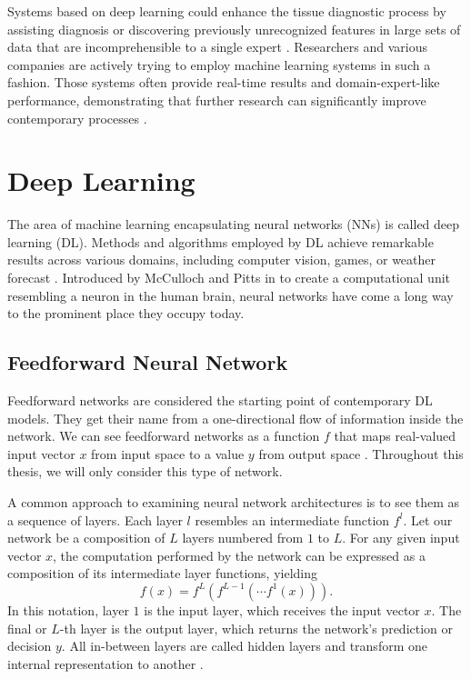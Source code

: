 Systems based on deep learning could enhance the tissue diagnostic process by assisting diagnosis or discovering previously unrecognized features in large sets of data that are incomprehensible to a single expert \cite{dss-digital-histopathology}. 
Researchers and various companies are actively trying to employ machine learning systems in such a fashion. 
Those systems often provide real-time results and domain-expert-like performance, demonstrating that further research can significantly improve contemporary processes \cite{deep-learning-in-histopathology}.

\section{Deep Learning}\label{section:dl}

The area of machine learning encapsulating neural networks (NNs) is called deep learning (DL).
Methods and algorithms employed by DL achieve remarkable results across various domains, including computer vision, games, or weather forecast \cite{alexnet, alphago, weather}.
Introduced by McCulloch and Pitts in \cite{mcculloch-pitts} to create a computational unit resembling a neuron in the human brain, neural networks have come a long way to the prominent place they occupy today.

\subsection*{Feedforward Neural Network}\label{feedforward-nn}

Feedforward networks are considered the starting point of contemporary DL models.
They get their name from a one-directional flow of information inside the network.
We can see feedforward networks as a function $f$ that maps real-valued input vector $x$ from input space to a value $y$ from output space \cite{goodfellow}.
Throughout this thesis, we will only consider this type of network.

A common approach to examining neural network architectures is to see them as a sequence of layers.
Each layer $l$ resembles an intermediate function $f^l$.
Let our network be a composition of $L$ layers numbered from $1$ to $L$.
For any given input vector $x$, the computation performed by the network can be expressed as a composition of its intermediate layer functions, yielding
\begin{equation}
    f(x) = f^L(f^{L-1}(\cdots f^1(x))).
\end{equation}
In this notation, layer $1$ is the input layer, which receives the input vector $x$. The final or $L$-th layer is the output layer, which returns the network's prediction or decision $y$. All in-between layers are called hidden layers and transform one internal representation to another \cite{goodfellow}.

